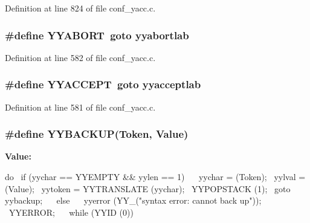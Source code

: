 Definition at line 824 of file conf\_\-yacc.c.
\subsubsection[{YYABORT}]{\setlength{\rightskip}{0pt plus 5cm}\#define YYABORT~goto yyabortlab}\label{conf__yacc_8c_a3bcde0b05b9aa4ec5169092d9d211dbd}


Definition at line 582 of file conf\_\-yacc.c.
\subsubsection[{YYACCEPT}]{\setlength{\rightskip}{0pt plus 5cm}\#define YYACCEPT~goto yyacceptlab}\label{conf__yacc_8c_aa6c7a65b580c214b2ea832fd7bdd472e}


Definition at line 581 of file conf\_\-yacc.c.
\subsubsection[{YYBACKUP}]{\setlength{\rightskip}{0pt plus 5cm}\#define YYBACKUP(Token, \/  Value)}\label{conf__yacc_8c_adfcaf974b837e3efc130377e9837b4fd}
{\bfseries Value:}
\begin{DoxyCode}
do                                                              \
  if (yychar == YYEMPTY && yylen == 1)                          \
    {                                                           \
      yychar = (Token);                                         \
      yylval = (Value);                                         \
      yytoken = YYTRANSLATE (yychar);                           \
      YYPOPSTACK (1);                                           \
      goto yybackup;                                            \
    }                                                           \
  else                                                          \
    {                                                           \
      yyerror (YY_("syntax error: cannot back up")); \
      YYERROR;                                                  \
    }                                                           \
while (YYID (0))
\end{DoxyCode}


